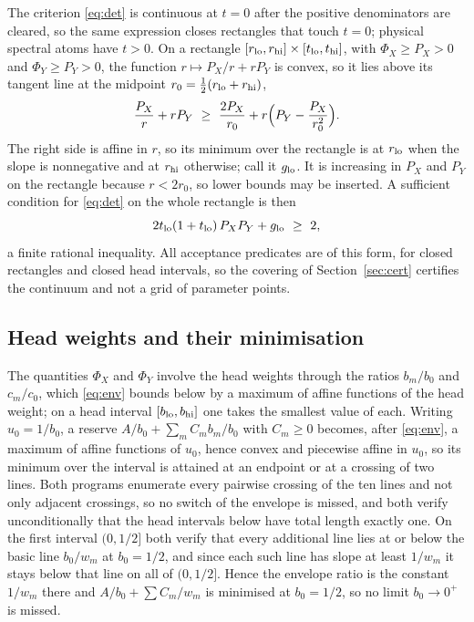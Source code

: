 \documentclass[10pt]{article}
\theoremstyle{remark}
\begin{document}
The criterion \eqref{eq:det} is continuous at $t=0$ after the positive denominators are cleared, so the same expression closes rectangles that touch $t=0$; physical spectral atoms have $t>0$. On a rectangle $[r_{\rm lo},r_{\rm hi}]\times[t_{\rm lo},t_{\rm hi}]$, with $\Phi_X\ge P_X>0$ and $\Phi_Y\ge P_Y>0$, the function $r\mapsto P_X/r+rP_Y$ is convex, so it lies above its tangent line at the midpoint $r_0=\tfrac12(r_{\rm lo}+r_{\rm hi})$,
\[
\frac{P_X}{r}+rP_Y\ \ge\ \frac{2P_X}{r_0}+r\Bigl(P_Y-\frac{P_X}{r_0^2}\Bigr).
\]
The right side is affine in $r$, so its minimum over the rectangle is at $r_{\rm lo}$ when the slope is nonnegative and at $r_{\rm hi}$ otherwise; call it $g_{\rm lo}$. It is increasing in $P_X$ and $P_Y$ on the rectangle because $r<2r_0$, so lower bounds may be inserted. A sufficient condition for \eqref{eq:det} on the whole rectangle is then
\begin{equation}\label{eq:rect}
2t_{\rm lo}(1+t_{\rm lo})\,P_XP_Y+g_{\rm lo}\ \ge\ 2 ,
\end{equation}
a finite rational inequality. All acceptance predicates are of this form, for closed rectangles and closed head intervals, so the covering of Section~\ref{sec:cert} certifies the continuum and not a grid of parameter points.

\subsection{Head weights and their minimisation}

The quantities $\Phi_X$ and $\Phi_Y$ involve the head weights through the ratios $b_m/b_0$ and $c_m/c_0$, which \eqref{eq:env} bounds below by a maximum of affine functions of the head weight; on a head interval $[b_{\rm lo},b_{\rm hi}]$ one takes the smallest value of each. Writing $u_0=1/b_0$, a reserve $A/b_0+\sum_mC_mb_m/b_0$ with $C_m\ge0$ becomes, after \eqref{eq:env}, a maximum of affine functions of $u_0$, hence convex and piecewise affine in $u_0$, so its minimum over the interval is attained at an endpoint or at a crossing of two lines. Both programs enumerate every pairwise crossing of the ten lines and not only adjacent crossings, so no switch of the envelope is missed, and both verify unconditionally that the head intervals below have total length exactly one. On the first interval $(0,1/2]$ both verify that every additional line lies at or below the basic line $b_0/w_m$ at $b_0=1/2$, and since each such line has slope at least $1/w_m$ it stays below that line on all of $(0,1/2]$. Hence the envelope ratio is the constant $1/w_m$ there and $A/b_0+\sum C_m/w_m$ is minimised at $b_0=1/2$, so no limit $b_0\to0^+$ is missed.
\end{document}
